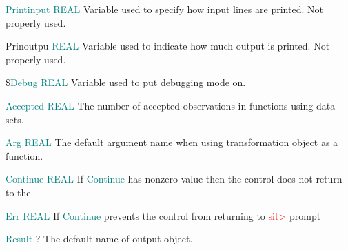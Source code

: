{\noindent \textcolor{teal}{Printinput} \tabto{25mm }   \textcolor{teal}{REAL} \tabto{45mm }   Variable used to specify how input lines are printed. Not properly used. 
 
\noindent Prinoutpu \tabto{25mm }   \textcolor{teal}{REAL} \tabto{45mm }   Variable used to indicate how much output is printed. Not properly used. 
 
 
 
 
 
 
\noindent \$\textcolor{teal}{Debug} \tabto{25mm }  \textcolor{teal}{REAL} \tabto{45mm }   Variable used to put debugging mode on. 
 
 
 
 
 
 
 
 
\noindent \textcolor{teal}{Accepted}  \tabto{25mm }  \textcolor{teal}{REAL} \tabto{45mm }   The number of accepted observations in functions using data sets. 
 
 
\noindent \textcolor{teal}{Arg} \tabto{25mm }   \textcolor{teal}{REAL}  \tabto{45mm }   The default argument name when using transformation object as a function. 
 
 
 
\noindent \textcolor{teal}{Continue}  \tabto{25mm }  \textcolor{teal}{REAL} \tabto{45mm }   If \textcolor{teal}{Continue} has nonzero value then the control does not return to the 
 
 
 
\noindent \textcolor{teal}{Err} \tabto{25mm }  \textcolor{teal}{REAL} \tabto{45mm }   If \textcolor{teal}{Continue} prevents the control from returning to \textcolor{Red}{sit>} prompt 
 
 
 
 
 
 
 
\noindent \textcolor{teal}{Result} \tabto{25mm }   ?  \tabto{45mm }   The default name of output object. 
 
}
